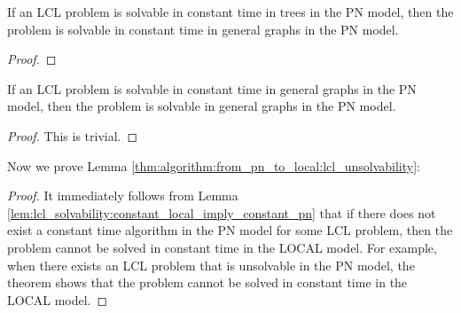 \begin{lemma} \label{lem:algorithm:from_pn_to_local:o1_pn_trees_imply_o1_pn_gen}
    If an LCL problem is solvable in constant time in trees in the PN model, then the problem is solvable in constant time in general graphs in the PN model.
\end{lemma}
\begin{proof}
\end{proof}

\begin{lemma} \label{lem:algorithm:from_pn_to_local:o1_pn_trees_imply_pn_gen}
    If an LCL problem is solvable in constant time in general graphs in the PN model, then the problem is solvable in general graphs in the PN model.
\end{lemma}
\begin{proof}
    This is trivial.
\end{proof}


Now we prove Lemma \ref{thm:algorithm:from_pn_to_local:lcl_unsolvability}:
\begin{proof}
    It immediately follows from Lemma \ref{lem:lcl_solvability:constant_local_imply_constant_pn} that if there does not exist a constant time algorithm in the PN model for some LCL problem, then the problem cannot be solved in constant time in the LOCAL model.
For example, when there exists an LCL problem that is unsolvable in the PN model, the theorem shows that the problem cannot be solved in constant time in the LOCAL model.
\end{proof}








